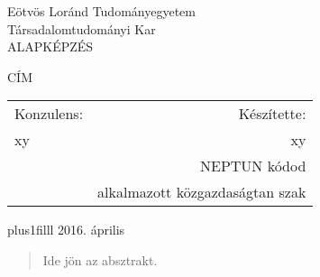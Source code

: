 \documentclass[12pt,a4paper]{report}
\begin{document}
\thispagestyle{empty}

\begin{center}
\LARGE
Eötvös Loránd Tudományegyetem \\
Társadalomtudományi Kar \\
ALAPKÉPZÉS

\vspace{60mm}

\Huge{CÍM}
\LARGE
\vspace{60mm}

\begin{tabular*}{\linewidth}{@{\extracolsep{\fill}}lr}
  Konzulens: & Készítette: \\
  xy & xy \\
   & NEPTUN kódod \\
   & alkalmazott közgazdaságtan szak
\end{tabular*}
\vskip0pt plus1filll
2016. április
\end{center}


\newpage
\setcounter{page}{1} 

\begin{abstract}

Ide jön az absztrakt.

\end{abstract}

\tableofcontents
\listoftables
\listoffigures
{}

\end{document}
